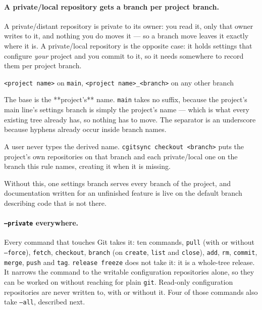 \paragraph{A private/local repository gets a branch per project branch.}
A private/distant repository is private to its owner: you read it, only that
owner writes to it, and nothing you do moves it --- so a branch move leaves
it exactly where it is. A private/local repository is the opposite case:
it holds settings that configure \emph{your} project and you commit to it,
so it needs somewhere to record them per project branch.

\begin{center}
\texttt{<project name>} on \texttt{main}, \quad
\texttt{<project name>\_<branch>} on any other branch
\end{center}

The base is the **project's** name. \texttt{main} takes no suffix, because
the project's main line's settings branch is simply the project's name ---
which is what every existing tree already has, so nothing has to move. The
separator is an underscore because hyphens already occur inside branch
names.

A user never types the derived name. \texttt{cgitsync checkout <branch>}
puts the project's own repositories on that branch and each private/local
one on the branch this rule names, creating it when it is missing.

Without this, one settings branch serves every branch of the project, and
documentation written for an unfinished feature is live on the default
branch describing code that is not there.

\paragraph{\texttt{--private} everywhere.} Every command that touches Git
takes it: ten commands, \texttt{pull} (with or without \texttt{--force}),
\texttt{fetch}, \texttt{checkout}, \texttt{branch} (on \texttt{create},
\texttt{list} and \texttt{close}), \texttt{add}, \texttt{rm},
\texttt{commit}, \texttt{merge}, \texttt{push} and \texttt{tag}. \texttt{release freeze}
does not take it: it is a whole-tree release. It
narrows the command to the writable
configuration repositories alone, so they can be worked on without
reaching for plain \texttt{git}. Read-only configuration repositories are
never written to, with or without it. Four of those commands also take
\texttt{--all}, described next.

